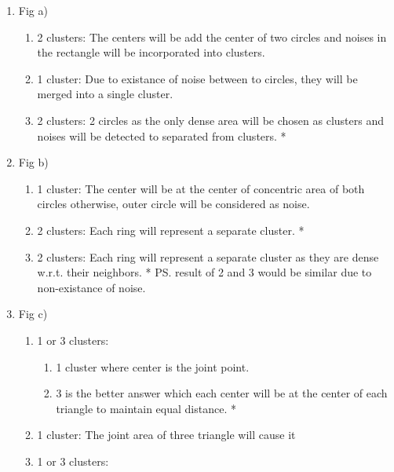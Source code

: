 \documentclass[11pt]{article}
\providecommand{\tightlist}{%
      \setlength{\itemsep}{0pt}\setlength{\parskip}{0pt}}
\begin{document}
\begin{enumerate}
\def\labelenumi{\arabic{enumi}.}
\tightlist
\item
  Fig a)

  \begin{enumerate}
  \def\labelenumii{\arabic{enumii}.}
  \tightlist
  \item
    2 clusters: The centers will be add the center of two circles and
    noises in the rectangle will be incorporated into clusters.
  \item
    1 cluster: Due to existance of noise between to circles, they will
    be merged into a single cluster.
  \item
    2 clusters: 2 circles as the only dense area will be chosen as
    clusters and noises will be detected to separated from clusters. *
  \end{enumerate}
\item
  Fig b)

  \begin{enumerate}
  \def\labelenumii{\arabic{enumii}.}
  \tightlist
  \item
    1 cluster: The center will be at the center of concentric area of
    both circles otherwise, outer circle will be considered as noise.
  \item
    2 clusters: Each ring will represent a separate cluster. *
  \item
    2 clusters: Each ring will represent a separate cluster as they are
    dense w.r.t. their neighbors. * PS. result of 2 and 3 would be
    similar due to non-existance of noise.
  \end{enumerate}
\item
  Fig c)

  \begin{enumerate}
  \def\labelenumii{\arabic{enumii}.}
  \tightlist
  \item
    1 or 3 clusters:

    \begin{enumerate}
    \def\labelenumiii{\arabic{enumiii}.}
    \tightlist
    \item
      1 cluster where center is the joint point.
    \item
      3 is the better answer which each center will be at the center of
      each triangle to maintain equal distance. *
    \end{enumerate}
  \item
    1 cluster: The joint area of three triangle will cause it
  \item
    1 or 3 clusters:


\end{enumerate}
\end{enumerate}
\end{document}
